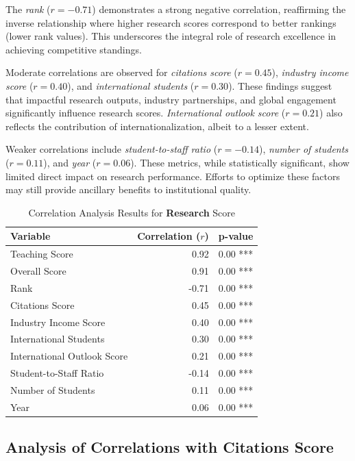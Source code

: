 \documentclass[conference]{IEEEtran}
\begin{document}
The \textit{rank} ($r = -0.71$) demonstrates a strong negative correlation, reaffirming the inverse relationship where higher research scores correspond to better rankings (lower rank values). This underscores the integral role of research excellence in achieving competitive standings.

Moderate correlations are observed for \textit{citations score} ($r = 0.45$), \textit{industry income score} ($r = 0.40$), and \textit{international students} ($r = 0.30$). These findings suggest that impactful research outputs, industry partnerships, and global engagement significantly influence research scores. \textit{International outlook score} ($r = 0.21$) also reflects the contribution of internationalization, albeit to a lesser extent.

Weaker correlations include \textit{student-to-staff ratio} ($r = -0.14$), \textit{number of students} ($r = 0.11$), and \textit{year} ($r = 0.06$). These metrics, while statistically significant, show limited direct impact on research performance. Efforts to optimize these factors may still provide ancillary benefits to institutional quality.

\begin{table}[h!]
	\centering
	\caption{Correlation Analysis Results for \textbf{Research} Score}
	\label{tab:correlation_research}
	\begin{tabular}{|l|r|r|}
		\hline
		\textbf{Variable} & \textbf{Correlation ($r$)} & \textbf{p-value} \\
		\hline
		Teaching Score & 0.92 & 0.00 *** \\
		Overall Score & 0.91 & 0.00 *** \\
		Rank & -0.71 & 0.00 *** \\
		Citations Score & 0.45 & 0.00 *** \\
		Industry Income Score & 0.40 & 0.00 *** \\
		International Students & 0.30 & 0.00 *** \\
		International Outlook Score & 0.21 & 0.00 *** \\
		Student-to-Staff Ratio & -0.14 & 0.00 *** \\
		Number of Students & 0.11 & 0.00 *** \\
		Year & 0.06 & 0.00 *** \\
		\hline
	\end{tabular}
\end{table}


\subsection{Analysis of Correlations with Citations Score}
\end{document}
